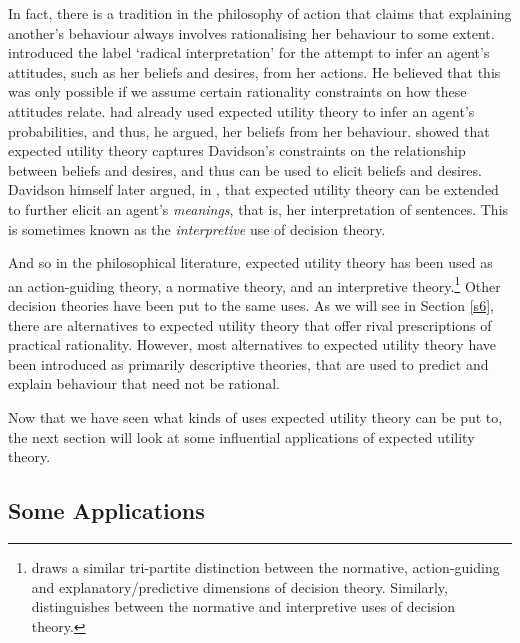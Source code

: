 In fact, there is a tradition in the philosophy of action that claims that explaining another's behaviour always involves rationalising her behaviour to some extent. \citet{Davidson1973} introduced the label `radical interpretation' for the attempt to infer an agent's attitudes, such as her beliefs and desires, from her actions. He believed that this was only possible if we assume certain rationality constraints on how these attitudes relate. \citet{Ramsey1926} had already used expected utility theory to infer an agent's probabilities, and thus, he argued, her beliefs from her behaviour. \citet{Lewis1974} showed that expected utility theory captures Davidson's constraints on the relationship between beliefs and desires, and thus can be used to elicit beliefs and desires. Davidson himself later argued, in \citet{Davidson1985}, that expected utility theory can be extended to further elicit an agent's {\em meanings}, that is, her interpretation of sentences. This is sometimes known as the {\em interpretive} use of decision theory.

And so in the philosophical literature, expected utility theory has been used as an action-guiding theory, a normative theory, and an interpretive theory.\footnote{\citet{Bermudez2009} draws a similar tri-partite distinction between the normative, action-guiding and explanatory/predictive dimensions of decision theory. Similarly, \citet{Buchak2016} distinguishes between the normative and interpretive uses of decision theory.} Other decision theories have been put to the same uses. As we will see in Section \ref{s6}, there are alternatives to expected utility theory that offer rival prescriptions of practical rationality. However, most alternatives to expected utility theory have been introduced as primarily descriptive theories, that are used to predict and explain behaviour that need not be rational.

Now that we have seen what kinds of uses expected utility theory can be put to, the next section will look at some influential applications of expected utility theory.

\subsection{Some Applications}\label{subs131}

